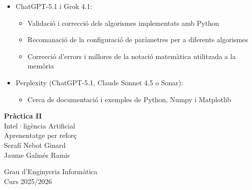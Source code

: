\documentclass[12pt,a4paper]{report}
\begin{document}
\begin{itemize}
  \item ChatGPT-5.1 i Grok 4.1:
  \begin{itemize}
    \item Validació i correcció dels algorismes implementats amb Python
    \item Recomanació de la configuració de paràmetres per a diferents algorismes
    \item Correcció d'errors i millores de la notació matemàtica utilitzada a la memòria
  \end{itemize}

  \item Perplexity (ChatGPT-5.1, Claude Sonnet 4.5 o Sonar):
  \begin{itemize}
    \item Cerca de documentació i exemples de Python, Numpy i Matplotlib
  \end{itemize}
\end{itemize}

\cleardoublepage
\thispagestyle{empty} %

\begin{center}
\vspace*{5cm} %

{\LARGE \textbf{Pràctica II}}\\[1em]
{\Large Intel·ligència Artificial}\\[4cm]

{\large Aprenentatge per reforç}\\[5cm]

{\large %
Serafí Nebot Ginard\\
Jaume Galmés Ramis\\[4cm]}

{\large Grau d'Enginyeria Informàtica\\Curs 2025/2026}

\end{center}
\end{document}
